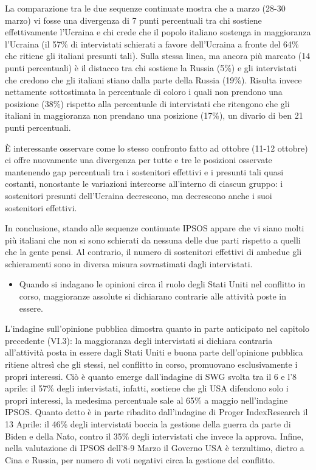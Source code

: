 \documentclass[
]{book}
\providecommand{\tightlist}{%
  \setlength{\itemsep}{0pt}\setlength{\parskip}{0pt}}
\begin{document}
La comparazione tra le due sequenze continuate mostra che a marzo (28-30 marzo) vi fosse una divergenza di 7 punti percentuali tra chi sostiene effettivamente l'Ucraina e chi crede che il popolo italiano sostenga in maggioranza l'Ucraina (il 57\% di intervistati schierati a favore dell'Ucraina a fronte del 64\% che ritiene gli italiani presunti tali). Sulla stessa linea, ma ancora più marcato (14 punti percentuali) è il distacco tra chi sostiene la Russia (5\%) e gli intervistati che credono che gli italiani stiano dalla parte della Russia (19\%). Risulta invece nettamente sottostimata la percentuale di coloro i quali non prendono una posizione (38\%) rispetto alla percentuale di intervistati che ritengono che gli italiani in maggioranza non prendano una posizione (17\%), un divario di ben 21 punti percentuali.

È interessante osservare come lo stesso confronto fatto ad ottobre (11-12 ottobre) ci offre nuovamente una divergenza per tutte e tre le posizioni osservate mantenendo gap percentuali tra i sostenitori effettivi e i presunti tali quasi costanti, nonostante le variazioni intercorse all'interno di ciascun gruppo: i sostenitori presunti dell'Ucraina decrescono, ma decrescono anche i suoi sostenitori effettivi.

In conclusione, stando alle sequenze continuate IPSOS appare che vi siano molti più italiani che non si sono schierati da nessuna delle due parti rispetto a quelli che la gente pensi. Al contrario, il numero di sostenitori effettivi di ambedue gli schieramenti sono in diversa misura sovrastimati dagli intervistati.

\begin{itemize}
\tightlist
\item
  Quando si indagano le opinioni circa il ruolo degli Stati Uniti nel conflitto in corso, maggioranze assolute si dichiarano contrarie alle attività poste in essere.
\end{itemize}

L'indagine sull'opinione pubblica dimostra quanto in parte anticipato nel capitolo precedente (VI.3): la maggioranza degli intervistati si dichiara contraria all'attività posta in essere dagli Stati Uniti e buona parte dell'opinione pubblica ritiene altresì che gli stessi, nel conflitto in corso, promuovano esclusivamente i propri interessi. Ciò è quanto emerge dall'indagine di SWG svolta tra il 6 e l'8 aprile: il 57\% degli intervistati, infatti, sostiene che gli USA difendono solo i propri interessi, la medesima percentuale sale al 65\% a maggio nell'indagine IPSOS. Quanto detto è in parte ribadito dall'indagine di Proger IndexResearch il 13 Aprile: il 46\% degli intervistati boccia la gestione della guerra da parte di Biden e della Nato, contro il 35\% degli intervistati che invece la approva.
Infine, nella valutazione di IPSOS dell'8-9 Marzo il Governo USA è terzultimo, dietro a Cina e Russia, per numero di voti negativi circa la gestione del conflitto.
\end{document}
